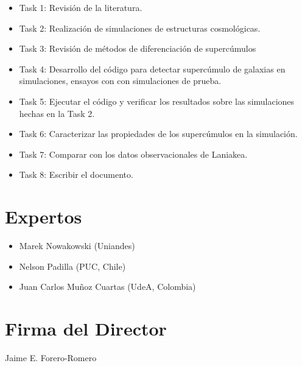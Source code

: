\documentclass[12pt]{article}
\begin{document}
\begin{itemize}
	\item Task 1: Revisi\'{o}n de la literatura. 
	\item Task 2: Realizaci\'on de simulaciones de estructuras
          cosmol\'{o}gicas. 
	\item Task 3: Revisi\'{o}n de m\'{e}todos de
          diferenciaci\'{o}n de superc\'{u}mulos 
	\item Task 4: Desarrollo del c\'{o}digo para detectar 
          superc\'{u}mulo de galaxias en simulaciones, ensayos con 
          con simulaciones de prueba.
	\item Task 5: Ejecutar el c\'{o}digo y verificar los
          resultados sobre las simulaciones hechas en la Task 2.
	\item Task 6: Caracterizar las propiedades de los
          superc\'umulos en la simulaci\'on.
	\item Task 7: Comparar con los datos observacionales de
          Laniakea. 
	\item Task 8: Escribir el documento.
\end{itemize}

\section{Expertos}

\begin{itemize}
	\item Marek Nowakowski (Uniandes)
	\item Nelson Padilla (PUC, Chile)
	\item Juan Carlos Mu\~noz Cuartas (UdeA, Colombia)
\end{itemize}


%


\section*{Firma del Director}
\vspace{2.5cm}

Jaime E. Forero-Romero
\end{document}
